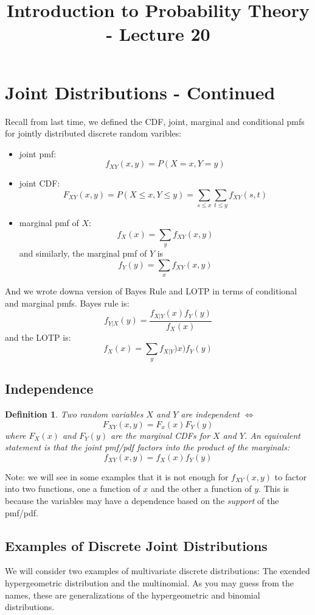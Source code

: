 \documentclass[12pt]{article} %
\date{}
\title{Introduction to Probability Theory - Lecture 20}
\newtheorem{defn}{Definition}
\begin{document}
\maketitle

\section{Joint Distributions - Continued}
Recall from last time, we defined the CDF, joint, marginal and conditional pmfs for jointly distributed discrete random varibles:
\begin{itemize}
\item joint pmf: $$f_{XY}(x,y) = P(X=x,Y=y)$$
\item joint CDF: $$F_{XY}(x,y) = P(X\leq x,Y\leq y) = \sum_{s\leq x}\sum_{t\leq y} f_{XY}(s,t)$$
\item marginal pmf of $X$:
$$f_X(x) = \sum_y f_{XY}(x,y)$$
and similarly, the marginal pmf of $Y$ is
$$f_{Y}(y) = \sum_x f_{XY}(x,y)$$  
\end{itemize}
And we wrote downa version of Bayes Rule and LOTP in terms of conditional and marginal pmfs. Bayes rule is:
$$f_{Y|X}(y) = \frac{f_{X|Y}(x) f_Y(y)}{f_X(x)}$$
and the LOTP is:
$$f_X(x) = \sum_y f_{X|Y})x) f_Y(y)$$
\subsection{Independence}
\begin{defn}
Two random variables $X$ and $Y$ are independent $\iff$ 
$$F_{XY}(x,y) = F_x(x)F_Y(y)$$
where $F_X(x)$ and $F_Y(y)$ are the marginal CDFs for $X$ and $Y$. An equivalent statement is that the joint pmf/pdf factors into the product of the marginals:
$$f_{XY}(x,y) = f_X(x)f_Y(y)$$
\end{defn} 
Note: we will see in some examples that it is not enough for $f_{XY}(x,y)$ to factor into two functions, one a function of $x$ and the other a function of $y$. This is because the variables may have a dependence based on the \emph{support} of the pmf/pdf.
\subsection{Examples of Discrete Joint Distributions}
We will consider two examples of multivariate discrete distributions: The exended hypergeometric distribution and the multinomial. As you may guess from the names, these are generalizations of the hypergeometric and binomial distributions.
\end{document}
